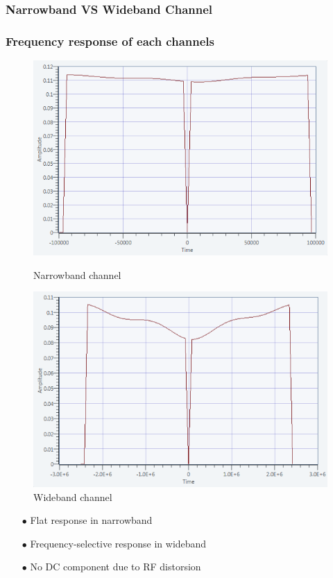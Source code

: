 \documentclass[11pt]{beamer}
\begin{document}
\subsubsection{Narrowband VS Wideband Channel}
\begin{frame}
\frametitle{Frequency response of each channels}

\begin{figure}[!ht]
    \begin{minipage}[b]{0.48\linewidth}
        \centering \includegraphics[scale=0.38]{img/channel_response_narrow.png}
		  \caption{Narrowband channel}
    \end{minipage}\hfill
    \begin{minipage}[b]{0.48\linewidth}
         \centering \includegraphics[scale=0.38]{img/channel_response_wideband.png}
         \caption{Wideband channel}
    \end{minipage}
\end{figure}
\begin{itemize}
\item[$\bullet$] Flat response in narrowband
\item[$\bullet$] Frequency-selective response in wideband 
\item[$\bullet$] No DC component due to RF distorsion
\end{itemize}

\end{frame}
\end{document}
